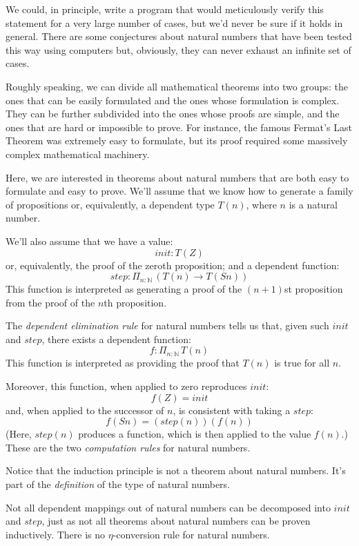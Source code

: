 \documentclass[DaoFP]{subfiles}
\begin{document}
We could, in principle, write a program that would meticulously verify this statement for a very large number of cases, but we'd never be sure if it holds in general. There are some conjectures about natural numbers that have been tested this way using computers but, obviously, they can never exhaust an infinite set of cases.

Roughly speaking, we can divide all mathematical theorems into two groups: the ones that can be easily formulated and the ones whose formulation is complex. They can be further subdivided into the ones whose proofs are simple, and the ones that are hard or impossible to prove. For instance, the famous Fermat's Last Theorem was extremely easy to formulate, but its proof required some massively complex mathematical machinery. 

Here, we are interested in theorems about natural numbers that are both easy to formulate and easy to prove. We'll assume that we know how to generate a family of propositions or, equivalently, a dependent type $T(n)$, where $n$ is a natural number. 

We'll also assume that we have a value:
\[\mathit{init} \colon T(Z) \]
or, equivalently, the proof of the zeroth proposition; and a dependent function:
\[\mathit{step} \colon \Pi_{n:\mathbb{N}}\,\left(T(n) \to T(S n)\right) \]
This function is interpreted as generating a proof of the $(n + 1)$st proposition from the proof of the $n$th proposition.

The \emph{dependent elimination rule} for natural numbers tells us that, given such $\mathit{init}$ and $\mathit{step}$, there exists a dependent function:
\[f \colon \Pi_{n:\mathbb{N}} \, T(n) \]
This function is interpreted as providing the proof that $T(n)$ is true for all $n$.

Moreover, this function, when applied to zero reproduces $\mathit{init}$:
\[ f (Z) = \mathit{init} \]
and, when applied to the successor of $n$, is consistent with taking a $\mathit{step}$:
\[ f (S n) = (\mathit{step} (n)) (f (n)) \]
(Here, $\mathit{step}(n)$ produces a function, which is then applied to the value $f(n)$.) These are the two \emph{computation rules} for natural numbers. 

Notice that the induction principle is not a theorem about natural numbers. It's part of the \emph{definition} of the type of natural numbers. 

Not all dependent mappings out of natural numbers can be decomposed into $\mathit{init}$ and $\mathit{step}$, just as not all theorems about natural numbers can be proven inductively. There is no $\eta$-conversion rule for natural numbers.
\end{document}
